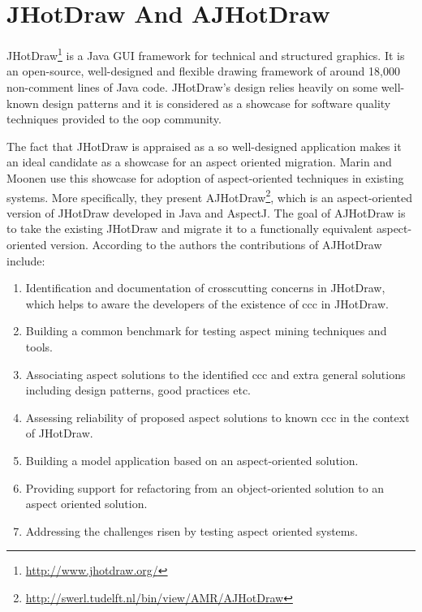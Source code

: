 \section{JHotDraw And AJHotDraw}\label{JHotDraw And AJHotDraw}
JHotDraw\footnote{\url{http://www.jhotdraw.org/}} is a Java GUI framework for technical and structured graphics. 
It is an open-source, well-designed and flexible drawing framework of around 18,000 non-comment lines of Java code. 
JHotDraw's  design relies heavily on some well-known design patterns\cite{gamma1995design} and it is considered as a showcase for software quality techniques provided to the \ac{oop} community. 

The fact that JHotDraw is appraised as a so well-designed application makes it an ideal candidate as a showcase for an aspect oriented migration. 
Marin and Moonen \cite{marinajhotdraw} use this showcase for adoption of aspect-oriented techniques in existing systems. 
More specifically, they present AJHotDraw\footnote{\url{http://swerl.tudelft.nl/bin/view/AMR/AJHotDraw}}, which is an aspect-oriented version of JHotDraw developed in Java and AspectJ. 
The goal of AJHotDraw is to take the existing JHotDraw and migrate it to a functionally equivalent aspect-oriented version. 
According to the authors the contributions of AJHotDraw include: 

\begin{enumerate}
	\item Identification and documentation of crosscutting concerns in JHotDraw, which helps to aware the developers of the existence of \ac{ccc} in JHotDraw.

	\item Building a common benchmark for testing aspect mining techniques and tools. 

	\item Associating aspect solutions to the identified \ac{ccc} and extra general solutions including design patterns, good practices etc. 

	\item Assessing reliability of proposed aspect solutions to known \ac{ccc} in the context of JHotDraw. 

	\item Building a model application based on an aspect-oriented solution.
	
	\item Providing support for refactoring from an object-oriented solution to an aspect oriented solution.
	
	\item Addressing the challenges risen by testing aspect oriented systems.
\end{enumerate}

